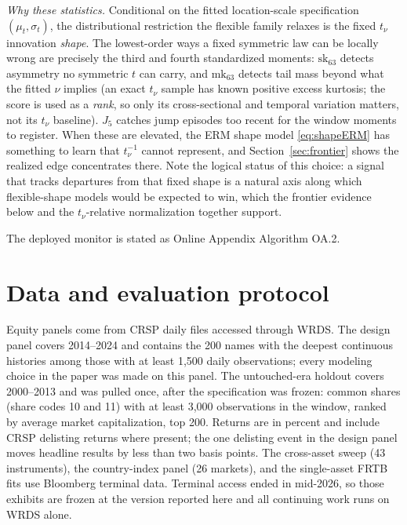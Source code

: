 \documentclass[11pt]{article}
\theoremstyle{remark}
\begin{document}
\emph{Why these statistics.} Conditional on the fitted location-scale
specification $(\mu_t,\sigma_t)$, the distributional restriction the
flexible family relaxes is the fixed $t_\nu$ innovation \emph{shape}.
The lowest-order ways a fixed symmetric law can be
locally wrong are precisely the third and fourth standardized moments:
$\mathrm{sk}_{63}$ detects asymmetry no symmetric $t$ can carry, and
$\mathrm{mk}_{63}$ detects tail mass beyond what the fitted $\nu$
implies (an exact $t_\nu$ sample has known positive excess kurtosis;
the score is used as a \emph{rank}, so only its cross-sectional and
temporal variation matters, not its $t_\nu$ baseline). $J_5$ catches
jump episodes too recent for the window moments to register. When these
are elevated, the ERM shape model \eqref{eq:shapeERM} has something to
learn that $t_\nu^{-1}$ cannot represent, and Section~\ref{sec:frontier} shows the realized edge concentrates there. Note the logical
status of this choice: a signal that tracks departures from that fixed
shape is a natural axis along which flexible-shape models would be
expected to win, which the frontier evidence below
and the $t_\nu$-relative normalization together support.

\noindent The deployed monitor is stated as Online Appendix Algorithm OA.2.

\section{Data and evaluation protocol}\label{sec:protocol}

Equity panels come from CRSP daily files accessed through WRDS. The
design panel covers 2014--2024 and contains the 200 names with the
deepest continuous histories among those with at least 1{,}500 daily
observations; every modeling choice in the paper was made on this
panel. The untouched-era holdout covers 2000--2013 and was pulled once,
after the specification was frozen: common shares (share codes 10 and
11) with at least 3{,}000 observations in the window, ranked by average
market capitalization, top 200. Returns are in percent and include
CRSP delisting returns where present; the one delisting event in the
design panel moves headline results by less than two basis points. The
cross-asset sweep (43 instruments), the country-index panel (26
markets), and the single-asset FRTB fits use Bloomberg terminal data.
Terminal access ended in mid-2026, so those exhibits are frozen at the
version reported here and all continuing work runs on WRDS alone.
\end{document}

